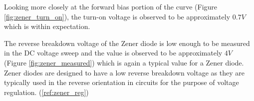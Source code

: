 \FloatBarrier

Looking more closely at the forward bias portion of the curve (Figure \ref{fig:zener_turn_on}), the turn-on voltage is observed to be approximately $0.7 V$ which is within expectation.

The reverse breakdown voltage of the Zener diode is low enough to be measured in the DC voltage sweep and the value is observed to be approximately $4 V$ (Figure \ref{fig:zener_measured}) which is again a typical value for a Zener diode. Zener diodes are designed to have a low reverse breakdown voltage as they are typically used in the reverse orientation in circuits for the purpose of voltage regulation. (\ref{ref:zener_reg})